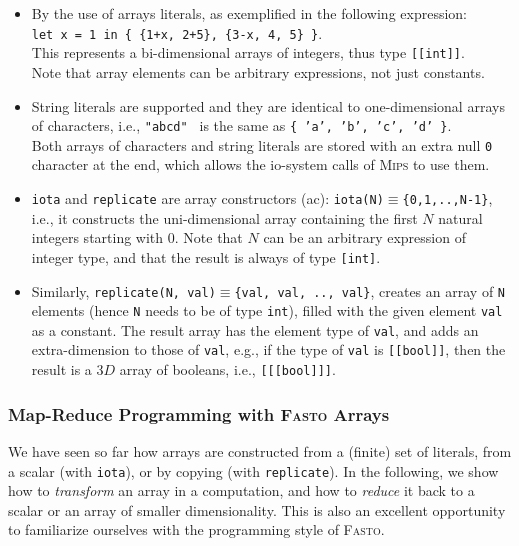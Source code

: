 \documentclass[a4paper,11pt]{article}
\newcommand{\fasto}{\textsc{Fasto}\xspace}
\newcommand{\mips}{\textsc{Mips}\xspace}
\begin{document}
\begin{itemize}
    \item By the use of arrays literals, as exemplified in the following expression:\\
        {\tt let x = 1 in \{ \{1+x, 2+5\}, \{3-x, 4, 5\} \}}.\\
        This represents a bi-dimensional arrays of integers, 
        thus type {\tt [[int]]}.\\
        Note that array elements can be arbitrary expressions, 
        not just constants.
    \item String literals are supported and they are identical to one-dimensional
            arrays of characters, i.e., {\tt "abcd" } is the same
            as {\tt \{ 'a', 'b', 'c', 'd' \}}.\\ 
            Both arrays of characters and string literals are stored with 
            an extra null {\tt 0} character at the end, which allows the 
            {\sc io}-system calls of \mips to use them.
    \item {\tt iota} and {\tt replicate} are array constructors ({\sc ac}):
            {\tt iota(N)}$\equiv${\tt \{0,1,..,N-1\}}, i.e., it constructs the
            uni-dimensional array containing the first $N$ natural integers 
            starting with $0$.
            Note that $N$ can be an arbitrary expression of integer type, and 
                that the result is always of type {\tt [int]}.
    \item Similarly, {\tt replicate(N, val)}$\equiv${\tt \{val, val, .., val\}},
            creates an array of {\tt N} elements (hence {\tt N}
            needs to be of type {\tt int}), filled with the given
            element {\tt val} as a constant.
          The result array has the element type of {\tt val}, and
            adds an extra-dimension to those of {\tt val}, e.g.,
            if the type of {\tt val} is {\tt [[bool]]}, then the result is a 
            $3D$ array of booleans, i.e., {\tt [[[bool]]]}.  
\end{itemize}



\subsubsection{Map-Reduce Programming with \fasto Arrays}
\label{subsec:map-red-prog}

We have seen so far how arrays are constructed from a (finite) set of
literals, from a scalar (with {\tt iota}), or by copying (with \texttt{replicate}).
In the following, we show how to \emph{transform} an array in a computation,
and how to \emph{reduce} it back to a scalar or an array of smaller dimensionality.
This is also an excellent opportunity to familiarize ourselves with
the programming style of \fasto.
\end{document}

